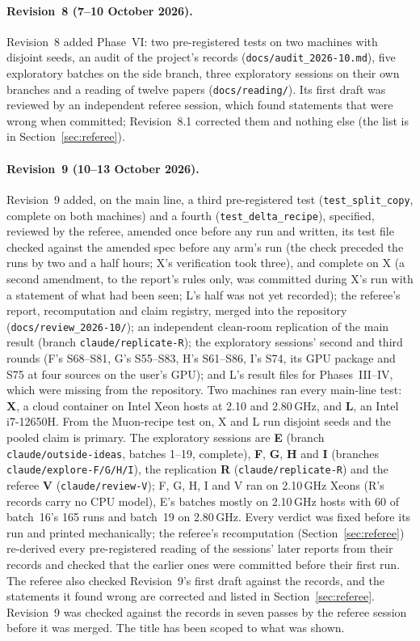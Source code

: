 \documentclass[11pt]{article}
\begin{document}
\paragraph{Revision~8 (7--10 October 2026).} Revision~8 added Phase~VI: two pre-registered tests on two machines with disjoint seeds, an audit of the project's records (\texttt{docs/audit\_2026-10.md}), five exploratory batches on the side branch, three exploratory sessions on their own branches and a reading of twelve papers (\texttt{docs/reading/}). Its first draft was reviewed by an independent referee session, which found statements that were wrong when committed; Revision~8.1 corrected them and nothing else (the list is in Section~\ref{sec:referee}).

\paragraph{Revision~9 (10--13 October 2026).}\sloppy Revision~9 added, on the main line, a third pre-registered test (\texttt{test\_split\_copy}, complete on both machines) and a fourth (\texttt{test\_delta\_recipe}), specified, reviewed by the referee, amended once before any run and written, its test file checked against the amended spec before any arm's run (the check preceded the runs by two and a half hours; X's verification took three), and complete on X (a second amendment, to the report's rules only, was committed during X's run with a statement of what had been seen; L's half was not yet recorded); the referee's report, recomputation and claim registry, merged into the repository (\texttt{docs/review\_2026-10/}); an independent clean-room replication of the main result (branch \texttt{claude/replicate-R}); the exploratory sessions' second and third rounds (F's S68--S81, G's S55--S83, H's S61--S86, I's S74, its GPU package and S75 at four sources on the user's GPU); and L's result files for Phases~III--IV, which were missing from the repository. Two machines ran every main-line test: \textbf{X}, a cloud container on Intel Xeon hosts at 2.10 and 2.80\,GHz, and \textbf{L}, an Intel i7-12650H. From the Muon-recipe test on, X and L run disjoint seeds and the pooled claim is primary. The exploratory sessions are \textbf{E} (branch \texttt{claude/outside-ideas}, batches 1--19, complete), \textbf{F}, \textbf{G}, \textbf{H} and \textbf{I} (branches \texttt{claude/explore-F/G/H/I}), the replication \textbf{R} (\texttt{claude/replicate-R}) and the referee \textbf{V} (\texttt{claude/review-V}); F, G, H, I and V ran on 2.10\,GHz Xeons (R's records carry no CPU model), E's batches mostly on 2.10\,GHz hosts with 60 of batch~16's 165 runs and batch~19 on 2.80\,GHz. Every verdict was fixed before its run and printed mechanically; the referee's recomputation (Section~\ref{sec:referee}) re-derived every pre-registered reading of the sessions' later reports from their records and checked that the earlier ones were committed before their first run. The referee also checked Revision~9's first draft against the records, and the statements it found wrong are corrected and listed in Section~\ref{sec:referee}. Revision~9 was checked against the records in seven passes by the referee session before it was merged. The title has been scoped to what was shown.
\end{document}
